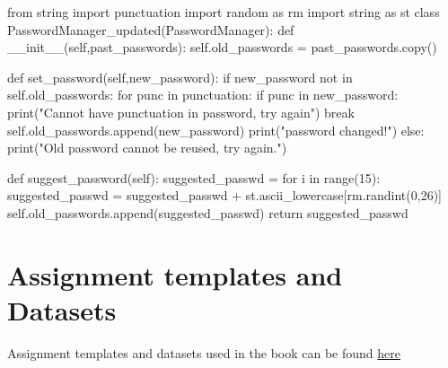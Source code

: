 \documentclass[
  letterpaper,
  DIV=11,
  numbers=noendperiod]{scrreprt}
\newenvironment{Shaded}{\begin{snugshade}}{\end{snugshade}}
\newcommand{\BuiltInTok}[1]{\textcolor[rgb]{0.00,0.23,0.31}{#1}}
\newcommand{\ControlFlowTok}[1]{\textcolor[rgb]{0.00,0.23,0.31}{#1}}
\newcommand{\DecValTok}[1]{\textcolor[rgb]{0.68,0.00,0.00}{#1}}
\newcommand{\FunctionTok}[1]{\textcolor[rgb]{0.28,0.35,0.67}{#1}}
\newcommand{\ImportTok}[1]{\textcolor[rgb]{0.00,0.46,0.62}{#1}}
\newcommand{\KeywordTok}[1]{\textcolor[rgb]{0.00,0.23,0.31}{#1}}
\newcommand{\NormalTok}[1]{\textcolor[rgb]{0.00,0.23,0.31}{#1}}
\newcommand{\OperatorTok}[1]{\textcolor[rgb]{0.37,0.37,0.37}{#1}}
\newcommand{\StringTok}[1]{\textcolor[rgb]{0.13,0.47,0.30}{#1}}
\newcommand{\VariableTok}[1]{\textcolor[rgb]{0.07,0.07,0.07}{#1}}
\begin{document}
\begin{Shaded}
\begin{Highlighting}[]
\ImportTok{from}\NormalTok{ string }\ImportTok{import}\NormalTok{ punctuation}
\ImportTok{import}\NormalTok{ random }\ImportTok{as}\NormalTok{ rm}
\ImportTok{import}\NormalTok{ string }\ImportTok{as}\NormalTok{ st}
\KeywordTok{class}\NormalTok{ PasswordManager\_updated(PasswordManager):}
    \KeywordTok{def} \FunctionTok{\_\_init\_\_}\NormalTok{(}\VariableTok{self}\NormalTok{,past\_passwords):}
        \VariableTok{self}\NormalTok{.old\_passwords }\OperatorTok{=}\NormalTok{ past\_passwords.copy()}
    
    \KeywordTok{def}\NormalTok{ set\_password(}\VariableTok{self}\NormalTok{,new\_password):}
        \ControlFlowTok{if}\NormalTok{ new\_password }\KeywordTok{not} \KeywordTok{in} \VariableTok{self}\NormalTok{.old\_passwords:}
            \ControlFlowTok{for}\NormalTok{ punc }\KeywordTok{in}\NormalTok{ punctuation:}
                \ControlFlowTok{if}\NormalTok{ punc }\KeywordTok{in}\NormalTok{ new\_password:}
                    \BuiltInTok{print}\NormalTok{(}\StringTok{"Cannot have punctuation in password, try again"}\NormalTok{)}
                    \ControlFlowTok{break}
            \VariableTok{self}\NormalTok{.old\_passwords.append(new\_password)}
            \BuiltInTok{print}\NormalTok{(}\StringTok{"password changed!"}\NormalTok{)}
        \ControlFlowTok{else}\NormalTok{:}
            \BuiltInTok{print}\NormalTok{(}\StringTok{"Old password cannot be reused, try again."}\NormalTok{)}
            
    \KeywordTok{def}\NormalTok{ suggest\_password(}\VariableTok{self}\NormalTok{):}
\NormalTok{        suggested\_passwd }\OperatorTok{=} \StringTok{\textquotesingle{}\textquotesingle{}}
        \ControlFlowTok{for}\NormalTok{ i }\KeywordTok{in} \BuiltInTok{range}\NormalTok{(}\DecValTok{15}\NormalTok{):}
\NormalTok{            suggested\_passwd }\OperatorTok{=}\NormalTok{ suggested\_passwd }\OperatorTok{+}\NormalTok{ st.ascii\_lowercase[rm.randint(}\DecValTok{0}\NormalTok{,}\DecValTok{26}\NormalTok{)]}
        \VariableTok{self}\NormalTok{.old\_passwords.append(suggested\_passwd)           }
        \ControlFlowTok{return}\NormalTok{ suggested\_passwd}
\end{Highlighting}
\end{Shaded}

\cleardoublepage
{}
{}
\appendix

\hypertarget{assignment-templates-and-datasets}{%
\chapter{Assignment templates and
Datasets}\label{assignment-templates-and-datasets}}

Assignment templates and datasets used in the book can be found
\href{https://nuwildcat-my.sharepoint.com/:f:/g/personal/akl0407_ads_northwestern_edu/EkQnSWXXMm5Ak8qCCWx2fVgBz3s-ksJ7xNgbzn-mmf0IFw?e=pebtNE}{here}
\end{document}
